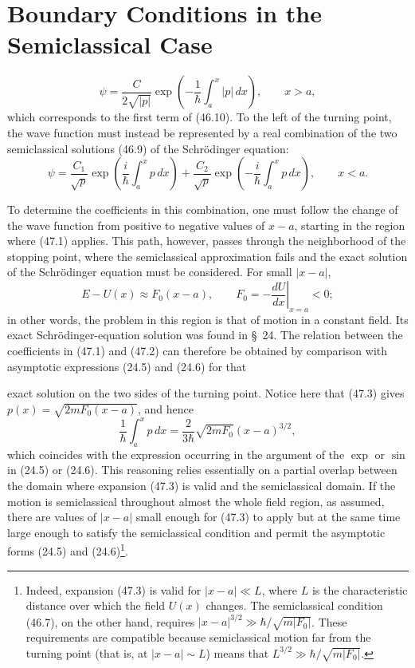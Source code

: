 \section{Boundary Conditions in the Semiclassical Case}


\begin{equation}
  \psi=\frac{C}{2\sqrt{|p|}}
  \exp\left(-\frac1\hbar\int_a^x|p|\,dx\right),\qquad x>a,
  \tag{47.1}
\end{equation}
which corresponds to the first term of (46.10). To the left of the turning
point, the wave function must instead be represented by a real combination
of the two semiclassical solutions (46.9) of the Schr\"odinger equation:
\begin{equation}
  \psi=\frac{C_1}{\sqrt p}\exp\left(\frac i\hbar\int_a^x p\,dx\right)
  +\frac{C_2}{\sqrt p}\exp\left(-\frac i\hbar\int_a^x p\,dx\right),
  \qquad x<a.
  \tag{47.2}
\end{equation}

To determine the coefficients in this combination, one must follow the change
of the wave function from positive to negative values of $x-a$, starting in
the region where (47.1) applies. This path, however, passes through the
neighborhood of the stopping point, where the semiclassical approximation
fails and the exact solution of the Schr\"odinger equation must be considered.
For small $|x-a|$,
\begin{equation}
  E-U(x)\approx F_0(x-a),\qquad
  F_0=-\left.\frac{dU}{dx}\right|_{x=a}<0;
  \tag{47.3}
\end{equation}
in other words, the problem in this region is that of motion in a constant
field. Its exact Schr\"odinger-equation solution was found in §~24. The
relation between the coefficients in (47.1) and (47.2) can therefore be
obtained by comparison with asymptotic expressions (24.5) and (24.6) for that

exact solution on the two sides of the turning point. Notice here that (47.3)
gives $p(x)=\sqrt{2mF_0(x-a)}$, and hence
\[
  \frac1\hbar\int_a^x p\,dx
  =\frac{2}{3\hbar}\sqrt{2mF_0}(x-a)^{3/2},
\]
which coincides with the expression occurring in the argument of the
$\exp$ or $\sin$ in (24.5) or (24.6). This reasoning relies essentially on a
partial overlap between the domain where expansion (47.3) is valid and the
semiclassical domain. If the motion is semiclassical throughout almost the
whole field region, as assumed, there are values of $|x-a|$ small enough for
(47.3) to apply but at the same time large enough to satisfy the
semiclassical condition and permit the asymptotic forms (24.5) and
(24.6)\footnote{Indeed, expansion (47.3) is valid for $|x-a|\ll L$, where
$L$ is the characteristic distance over which the field $U(x)$ changes. The
semiclassical condition (46.7), on the other hand, requires
$|x-a|^{3/2}\gg\hbar/\sqrt{m|F_0|}$. These requirements are compatible because
semiclassical motion far from the turning point (that is, at $|x-a|\sim L$)
means that $L^{3/2}\gg\hbar/\sqrt{m|F_0|}$.}.

